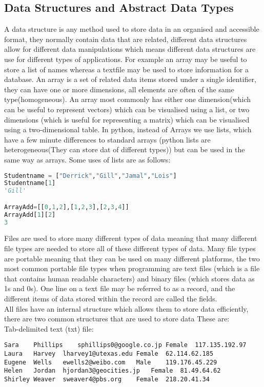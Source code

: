 \documentclass[a4paper]{article}
\begin{document}
		\subsection{Data Structures and Abstract Data Types}
			A data structure is any method used to store data in an organised and accessible format, they normally contain data that are related, different data structures allow for different data manipulations which means different data structures are use for different types of applications. For example an array may be useful to store a list of names whereas a textfile may be used to store information for a database.
			An array is a set of related data items stored under a single identifier, they can have one or more dimensions, all elements are often of the same type(homogeneous). An array most commonly has either one dimension(which can be useful to represent vectors) which can be visualised using a list, or two dimensions (which is useful for representing a matrix) which can be visualised using a two-dimensional table. In python, instead of Arrays we use lists, which have a few minute differences to standard arrays (python lists are heterogeneous(They can store dat of different types)) but can be used in the same way as arrays. Some uses of lists are as follows:
			\begin{lstlisting}[language=python]
Studentname = ["Derrick","Gill","Jamal","Lois"]
Studentname[1]
'Gill'

ArrayAdd=[[0,1,2],[1,2,3],[2,3,4]]
ArrayAdd[1][2]
3		\end{lstlisting}
			Files are used to store many different types of data meaning that many different file types are needed to store all of these different types of data. Many file types are portable meaning that they can be used on many different platforms, the two most common portable file types when programming are text files (which is a file that contains human readable characters) and binary files (which stores data as 1s and 0s). One line on a text file may be referred to as a record, and the different items of data stored within the record are called the fields.\\
			All files have an internal structure which allows them to store data efficiently, there are two common structures that are used to store data These are:\\
			Tab-delimited text (txt) file:
			\begin{lstlisting}
Sara	Phillips	sphillips0@google.co.jp	Female	117.135.192.97
Laura	Harvey	lharvey1@utexas.edu	Female	62.114.62.185
Eugene	Wells	ewells2@weibo.com	Male	119.176.45.229
Helen	Jordan	hjordan3@geocities.jp	Female	81.49.64.62
Shirley	Weaver	sweaver4@pbs.org	Female	218.20.41.34	\end{lstlisting}
\end{document}
